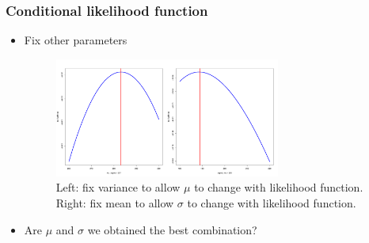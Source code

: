 \documentclass[10pt]{beamer}
\begin{document}
\begin{frame}[allowframebreaks]
  \frametitle{Conditional likelihood function}

  \begin{itemize}
  \item Fix other parameters
    \begin{figure}
      \includegraphics[width=0.7\textwidth]{conddesity}
      \caption{Left: fix variance to allow $\mu$ to change with likelihood
        function. Right: fix mean to allow $\sigma$ to change with likelihood function.}
    \end{figure}

  \item  Are $\mu$ and $\sigma$ we obtained the best combination?









\end{itemize}
\end{frame}
\end{document}
